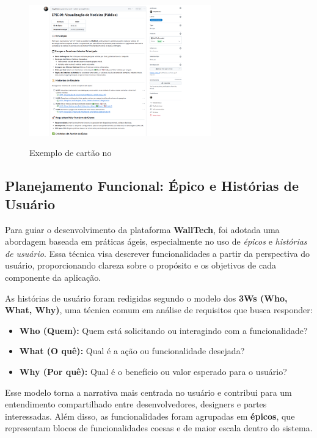 \begin{figure}[H]
  \centering
  \caption{Exemplo de cartão  no }
  \includegraphics[width=0.7\textwidth]{media/wall_tech_epic.png}
  \label{fig:kanban-userstories}
\end{figure}




\subsection{Planejamento Funcional: Épico e Histórias de Usuário}

Para guiar o desenvolvimento da plataforma \textbf{WallTech}, foi adotada uma abordagem baseada em práticas ágeis, especialmente no uso de \textit{épicos} e \textit{histórias de usuário}. Essa técnica visa descrever funcionalidades a partir da perspectiva do usuário, proporcionando clareza sobre o propósito e os objetivos de cada componente da aplicação.

As histórias de usuário foram redigidas segundo o modelo dos \textbf{3Ws (Who, What, Why)}, uma técnica comum em análise de requisitos que busca responder:
\begin{itemize}
  \item \textbf{Who (Quem):} Quem está solicitando ou interagindo com a funcionalidade?
  \item \textbf{What (O quê):} Qual é a ação ou funcionalidade desejada?
  \item \textbf{Why (Por quê):} Qual é o benefício ou valor esperado para o usuário?
\end{itemize}

Esse modelo torna a narrativa mais centrada no usuário e contribui para um entendimento compartilhado entre desenvolvedores, designers e partes interessadas. Além disso, as funcionalidades foram agrupadas em \textbf{épicos}, que representam blocos de funcionalidades coesas e de maior escala dentro do sistema.

